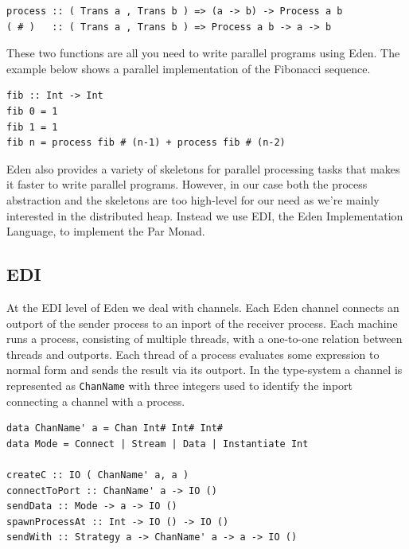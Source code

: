 \documentclass[a4paper, oneside, final]{article}
\begin{document}
\begin{lstlisting}
process :: ( Trans a , Trans b ) => (a -> b) -> Process a b
( # )   :: ( Trans a , Trans b ) => Process a b -> a -> b
\end{lstlisting}

These two functions are all you need to write parallel programs using
Eden. The example below shows a parallel implementation of the
Fibonacci sequence. \newline

\begin{lstlisting}
fib :: Int -> Int
fib 0 = 1
fib 1 = 1
fib n = process fib # (n-1) + process fib # (n-2)
\end{lstlisting}

Eden also provides a variety of skeletons for parallel processing
tasks that makes it faster to write parallel programs. However, in
our case both the process abstraction and the skeletons are too 
high-level for our need as we're mainly interested in the distributed
heap. Instead we use EDI, the Eden Implementation Language, to
implement the Par Monad.

\subsection{EDI}
\label{sub:edi}

At the EDI level of Eden we deal with channels. Each Eden channel
connects an outport of the sender process to an inport of the receiver
process. Each machine runs a process, consisting of multiple threads,
with a one-to-one relation between threads and outports. Each thread
of a process evaluates some expression to normal form and sends the
result via its outport. In the type-system a channel is represented as
\texttt{ChanName} with three integers used to identify the inport
connecting a channel with a process. \newline

\begin{lstlisting}
data ChanName' a = Chan Int# Int# Int#
data Mode = Connect | Stream | Data | Instantiate Int

createC :: IO ( ChanName' a, a ) 
connectToPort :: ChanName' a -> IO ()
sendData :: Mode -> a -> IO ()
spawnProcessAt :: Int -> IO () -> IO ()
sendWith :: Strategy a -> ChanName' a -> a -> IO ()
\end{lstlisting}
\end{document}
